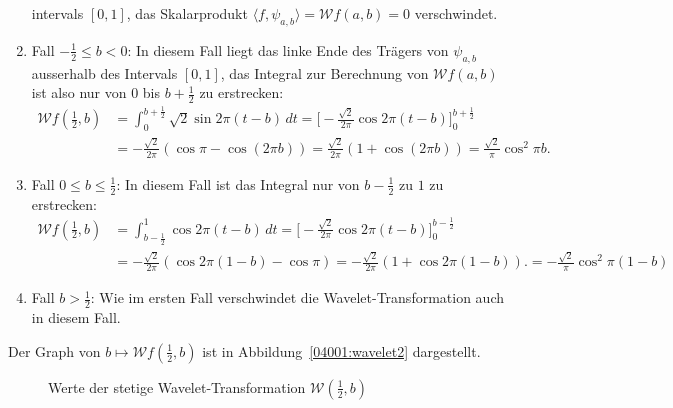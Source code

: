 \begin{loesung}
\begin{teilaufgaben}
\begin{enumerate}
intervals $[0,1]$, das Skalarprodukt
$\langle f,\psi_{a,b}\rangle=\mathcal{W}f(a,b)=0$ verschwindet.
\item
Fall $-\frac12\le b < 0$: In diesem Fall liegt das linke Ende des Trägers
von $\psi_{a,b}$ ausserhalb des Intervals $[0,1]$, das Integral zur Berechnung
von $\mathcal{W}f(a,b)$ ist also nur von $0$ bis $b+\frac12$ zu erstrecken:
\begin{align*}
\mathcal{W}f({\textstyle\frac12},b)
&=
\int_{0}^{b+\frac12} \sqrt{2} \sin 2\pi(t-b)\,dt
=
\biggl[
-
\frac{\sqrt{2}}{2\pi}
\cos 2\pi(t-b)
\biggr]_0^{b+\frac12}
\\
&=
-\frac{\sqrt{2}}{2\pi}(\cos\pi - \cos(2\pi b))
=
\frac{\sqrt{2}}{2\pi}(1+\cos(2\pi b))
=
\frac{\sqrt{2}}{\pi}
\cos^2 \pi b.
\end{align*}
\item
Fall $0\le b \le \frac12$: In diesem Fall ist das Integral nur von $b-\frac12$
zu $1$ zu erstrecken:
\begin{align*}
\mathcal{W}f({\textstyle\frac12},b)
&=
\int_{b-\frac12}^1 \cos 2\pi (t-b)\,dt
=
\biggl[
-\frac{\sqrt{2}}{2\pi}\cos 2\pi(t-b)
\biggr]_0^{b-\frac12}
\\
&=
-\frac{\sqrt{2}}{2\pi}(
\cos 2\pi(1-b)
-
\cos \pi
)
=
-\frac{\sqrt{2}}{2\pi}(1+\cos 2\pi(1-b)).
=
-\frac{\sqrt{2}}{\pi}\cos^2\pi(1-b)
\end{align*}
\item
Fall $b > \frac12$:
Wie im ersten Fall verschwindet die Wavelet-Transformation auch in diesem
Fall.
\end{enumerate}
Der Graph von $b\mapsto \mathcal{W}f(\frac12,b)$ ist in
Abbildung~\ref{04001:wavelet2} dargestellt.
\begin{figure}
\centering
{}
\caption{Werte der stetige Wavelet-Transformation $\mathcal{W}(\frac12,b)$
}
\end{figure}
\end{teilaufgaben}
\end{loesung}
